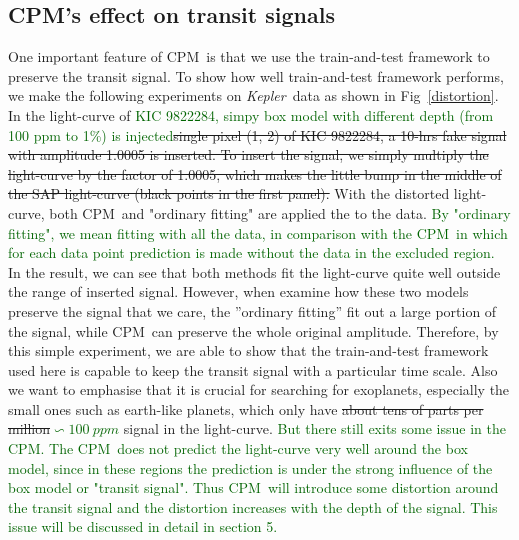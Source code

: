 \documentclass[12pt, preprint]{aastex}
\newcommand{\project}[1]{\textsl{#1}}
\newcommand{\Kepler}{\project{Kepler}}
\newcommand{\name}{CPM}
\newcommand{\revise}[1]{\textcolor{darkgreen}{#1}}
\newcommand{\remove}[1]{\sout{#1}}
\begin{document}
\subsection{\name's effect on transit signals}
One important feature of \name\ is that we use the train-and-test framework to preserve 
the transit signal. To show how well train-and-test framework performs, we make the
following experiments on \Kepler\ data as shown in Fig~\ref{distortion}.
In the light-curve of \revise{KIC 9822284, simpy box model with different depth (from 100 ppm to 1\%) is injected}\remove{single pixel (1, 2) of KIC 9822284, a 10-hrs fake signal 
with amplitude 1.0005 is inserted. To insert the signal, we simply multiply the light-curve 
by the factor of 1.0005, which makes the little bump in the middle of the SAP light-curve 
(black points in the first panel).} With the distorted light-curve, both \name\ and "ordinary fitting" are applied the to the data. 
\revise{By "ordinary fitting", we mean fitting with all the data,  in comparison with the \name\, in which for each data point prediction is made without the data in the excluded region.}  
In the result, we can see that both methods fit the light-curve quite well outside the range of inserted signal. 
However, when examine how these two models preserve the signal that we care, the ''ordinary fitting'' fit out a large portion of the signal, while \name\ can preserve the whole 
original amplitude. Therefore,  by this simple experiment, we are able to show that the train-and-test framework used here is capable to keep the transit signal with a particular time scale. 
Also we want to emphasise that it is crucial for searching for
exoplanets, especially the small ones such as earth-like planets, which only have \remove{about tens of parts per million}\revise{$\backsim 100\ ppm$} signal in the light-curve. \revise{But there still exits some issue in the \name. 
The \name\ does not predict the light-curve very well around the box model, since in these regions the prediction is under the strong influence of the box model or "transit signal". 
Thus \name\ will introduce some distortion around the transit signal and the distortion increases with the depth of the signal. This issue will be discussed in detail in section 5.}
\end{document}
